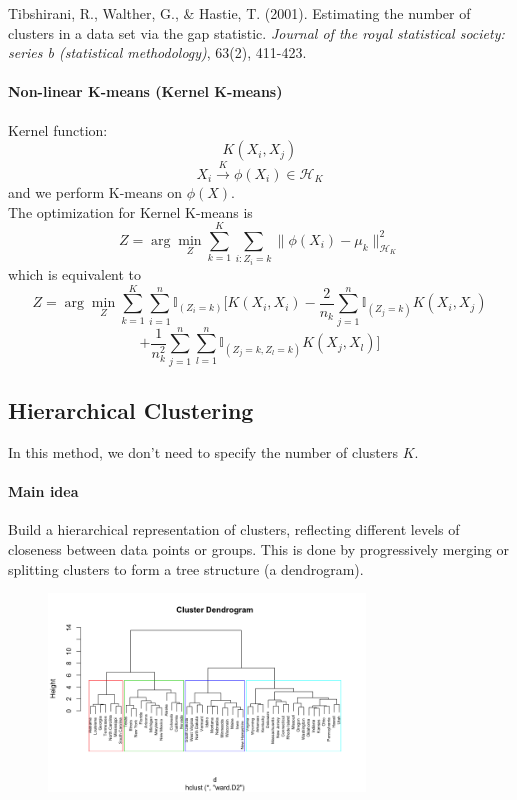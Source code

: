 \documentclass[12pt]{book}
\theoremstyle{definition}
\theoremstyle{remark}
\begin{document}
\begin{referencebox}
    Tibshirani, R., Walther, G., \& Hastie, T. (2001). Estimating the number of clusters in a data set via the gap statistic. \textit{Journal of the royal statistical society: series b (statistical methodology)}, 63(2), 411-423.
\end{referencebox}



\paragraph{Non-linear K-means (Kernel K-means)}
Kernel function:
\[K(X_i,X_j)\]
\[X_i \overset{K}{\rightarrow} \phi(X_i) \in \mathcal{H}_K\]
and we perform K-means on $\phi(X)$.\\

The optimization for Kernel K-means is
\[Z = \arg\min_{Z}\sum_{k=1}^K \sum_{i:Z_i = k}\|\phi(X_i) - \mu_k\|^2_{\mathcal{H}_K}\]
which is equivalent to 
\[Z = \arg\min_{Z} \sum_{k=1}^K \sum_{i=1}^n \mathbb{I}_{(Z_i = k)}\bigl[ K(X_i,X_i) - \frac2{n_k} \sum_{j=1}^n\mathbb{I}_{(Z_j = k)} K(X_i,X_j)\]\[+\frac1{n_k^2}\sum_{j=1}^n\sum_{l=1}^n\mathbb{I}_{(Z_j = k,Z_l = k)}K(X_j,X_l)\bigr]\]


\subsection{Hierarchical Clustering}
In this method, we don't need to specify the number of clusters $K$.
\paragraph{Main idea}
Build a hierarchical representation of clusters, reflecting different levels of closeness between data points or groups. This is done by progressively merging or splitting clusters to form a tree structure (a dendrogram).

\begin{figure}[h]
\centering
\includegraphics[width=0.75\textwidth]{601-10-2-2.png}
\caption{}
\label{601-10-2-2}
\end{figure}
\end{document}
